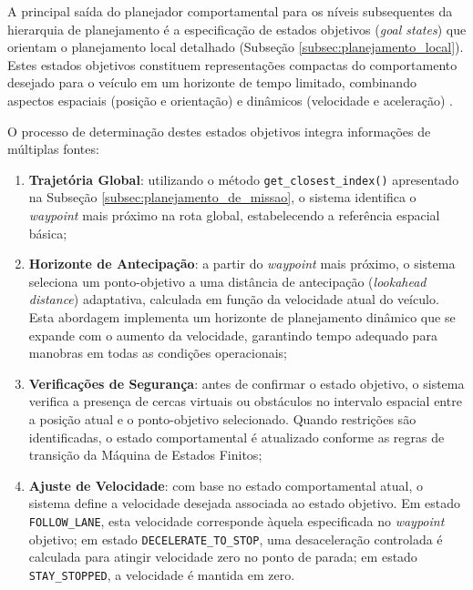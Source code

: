 A principal saída do planejador comportamental para os níveis subsequentes da hierarquia de planejamento é a especificação de estados objetivos (\textit{goal states}) que orientam o planejamento local detalhado (Subseção \ref{subsec:planejamento_local}). Estes estados objetivos constituem representações compactas do comportamento desejado para o veículo em um horizonte de tempo limitado, combinando aspectos espaciais (posição e orientação) e dinâmicos (velocidade e aceleração) \cite{University_of_Toronto2018-mp}.

O processo de determinação destes estados objetivos integra informações de múltiplas fontes:

\begin{enumerate}
    \item \textbf{Trajetória Global}: utilizando o método \texttt{get\_closest\_index()} apresentado na Subseção \ref{subsec:planejamento_de_missao}, o sistema identifica o \textit{waypoint} mais próximo na rota global, estabelecendo a referência espacial básica;
    
    \item \textbf{Horizonte de Antecipação}: a partir do \textit{waypoint} mais próximo, o sistema seleciona um ponto-objetivo a uma distância de antecipação (\textit{lookahead distance}) adaptativa, calculada em função da velocidade atual do veículo. Esta abordagem implementa um horizonte de planejamento dinâmico que se expande com o aumento da velocidade, garantindo tempo adequado para manobras em todas as condições operacionais;
    
    \item \textbf{Verificações de Segurança}: antes de confirmar o estado objetivo, o sistema verifica a presença de cercas virtuais ou obstáculos no intervalo espacial entre a posição atual e o ponto-objetivo selecionado. Quando restrições são identificadas, o estado comportamental é atualizado conforme as regras de transição da Máquina de Estados Finitos;
    
    \item \textbf{Ajuste de Velocidade}: com base no estado comportamental atual, o sistema define a velocidade desejada associada ao estado objetivo. Em estado \texttt{FOLLOW\_LANE}, esta velocidade corresponde àquela especificada no \textit{waypoint} objetivo; em estado \texttt{DECELERATE\_TO\_STOP}, uma desaceleração controlada é calculada para atingir velocidade zero no ponto de parada; em estado \texttt{STAY\_STOPPED}, a velocidade é mantida em zero.
\end{enumerate}

